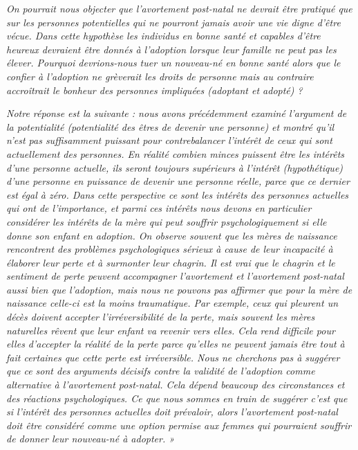 \begin{displayquote}
\emph{On pourrait nous objecter que l'avortement post-natal ne devrait être pratiqué que sur les personnes potentielles qui ne pourront jamais avoir une vie digne d'être vécue. Dans cette hypothèse les individus en bonne santé et capables d'être heureux devraient être donnés à l'adoption lorsque leur famille ne peut pas les élever. Pourquoi devrions-nous tuer un nouveau-né en bonne santé alors que le confier à l'adoption ne grèverait les droits de personne mais au contraire accroîtrait le bonheur des personnes impliquées (adoptant et adopté) ?}

\emph{Notre réponse est la suivante : nous avons précédemment examiné l'argument de la potentialité (potentialité des êtres de devenir une personne) et montré qu'il n'est pas suffisamment puissant pour contrebalancer l'intérêt de ceux qui sont actuellement des personnes. En réalité combien minces puissent être les intérêts d'une personne actuelle, ils seront toujours supérieurs à l'intérêt (hypothétique) d'une personne en puissance de devenir une personne réelle, parce que ce dernier est égal à zéro. Dans cette perspective ce sont les intérêts des personnes actuelles qui ont de l'importance, et parmi ces intérêts nous devons en particulier considérer les intérêts de la mère qui peut souffrir psychologiquement si elle donne son enfant en adoption. On observe souvent que les mères de naissance rencontrent des problèmes psychologiques sérieux à cause de leur incapacité à élaborer leur perte et à surmonter leur chagrin. Il est vrai que le chagrin et le sentiment de perte peuvent accompagner l'avortement et l'avortement post-natal aussi bien que l'adoption, mais nous ne pouvons pas affirmer que pour la mère de naissance celle-ci est la moins traumatique. Par exemple, ceux qui pleurent un décès doivent accepter l'irréversibilité de la perte, mais souvent les mères naturelles rêvent que leur enfant va revenir vers elles. Cela rend difficile pour elles d'accepter la réalité de la perte parce qu'elles ne peuvent jamais être tout à fait certaines que cette perte est irréversible.
Nous ne cherchons pas à suggérer que ce sont des arguments décisifs contre la validité de l'adoption comme alternative à l'avortement post-natal. Cela dépend beaucoup des circonstances et des réactions psychologiques. Ce que nous sommes en train de suggérer c'est que si l'intérêt des personnes actuelles doit prévaloir, alors l'avortement post-natal doit être considéré comme une option permise aux femmes qui pourraient souffrir de donner leur nouveau-né à adopter. »}
\end{displayquote}

